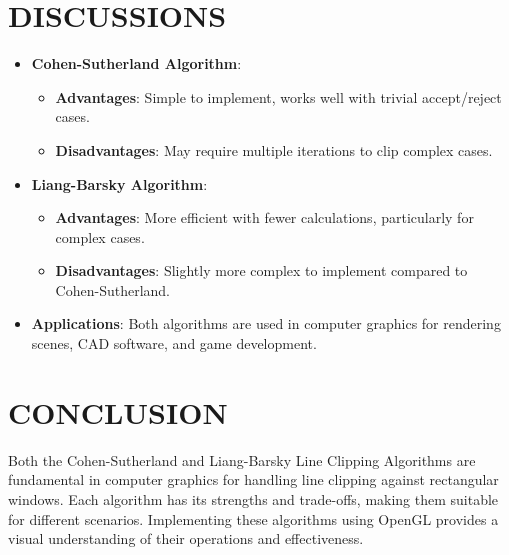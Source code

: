 \documentclass{article}
\begin{document}
\section*{DISCUSSIONS}
\begin{itemize}
    \item \textbf{Cohen-Sutherland Algorithm}: 
    \begin{itemize}
        \item \textbf{Advantages}: Simple to implement, works well with trivial accept/reject cases.
        \item \textbf{Disadvantages}: May require multiple iterations to clip complex cases.
    \end{itemize}
    \item \textbf{Liang-Barsky Algorithm}:
    \begin{itemize}
        \item \textbf{Advantages}: More efficient with fewer calculations, particularly for complex cases.
        \item \textbf{Disadvantages}: Slightly more complex to implement compared to Cohen-Sutherland.
    \end{itemize}
    \item \textbf{Applications}: Both algorithms are used in computer graphics for rendering scenes, CAD software, and game development.
\end{itemize}

\section*{CONCLUSION}
Both the Cohen-Sutherland and Liang-Barsky Line Clipping Algorithms are fundamental in computer graphics for handling line clipping against rectangular windows. Each algorithm has its strengths and trade-offs, making them suitable for different scenarios. Implementing these algorithms using OpenGL provides a visual understanding of their operations and effectiveness.
\end{document}
